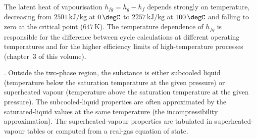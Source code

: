 

The latent heat of vapourisation $h_{fg} = h_g - h_f$ depends
strongly on temperature, decreasing from $2501\,\text{kJ}/\text{kg}$
at $0\,\degC$ to $2257\,\text{kJ}/\text{kg}$ at $100\,\degC$ and
falling to zero at the critical point ($647\,\si{\kelvin}$). The
temperature dependence of $h_{fg}$ is responsible for the difference
between cycle calculations at different operating temperatures and
for the higher efficiency limits of high-temperature processes
(chapter~3 of this volume).

. Outside the two-phase
region, the substance is either subcooled liquid (temperature below
the saturation temperature at the given pressure) or superheated
vapour (temperature above the saturation temperature at the given
pressure). The subcooled-liquid properties are often approximated by
the saturated-liquid values at the same temperature (the
incompressibility approximation). The superheated-vapour properties
are tabulated in superheated-vapour tables or computed from a
real-gas equation of state.

